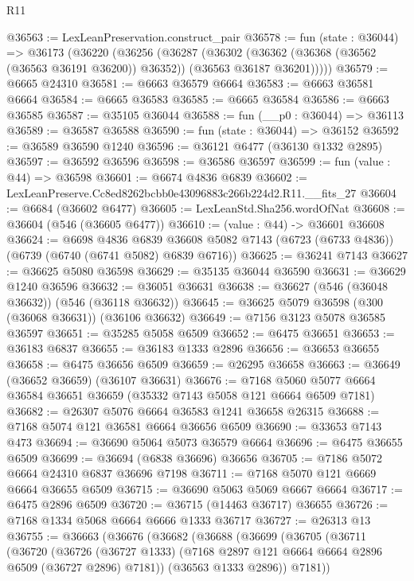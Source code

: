 \begin{lexlean}{R11}
\begin{coremodule}
@36563 := LexLeanPreservation.construct_pair
@36578 := fun (state : @36044) =>
  @36173
    (@36220
      (@36256
        (@36287
          (@36302
            (@36362 (@36368 (@36562 (@36563 @36191 @36200)) @36352))
            (@36563 @36187 @36201)))))
@36579 := @6665 @24310
@36581 := @6663 @36579 @6664
@36583 := @6663 @36581 @6664
@36584 := @6665 @36583
@36585 := @6665 @36584
@36586 := @6663 @36585
@36587 := @35105 @36044
@36588 := fun (__p0 : @36044) => @36113
@36589 := @36587 @36588
@36590 := fun (state : @36044) => @36152
@36592 := @36589 @36590 @1240
@36596 := @36121 @6477 (@36130 @1332 @2895)
@36597 := @36592 @36596
@36598 := @36586 @36597
@36599 := fun (value : @44) => @36598
@36601 := @6674 @4836 @6839
@36602 := LexLeanPreserve.Cc8ed8262bcbb0e43096883c266b224d2.R11.__fits_27
@36604 := @6684 (@36602 @6477)
@36605 := LexLeanStd.Sha256.wordOfNat
@36608 := @36604 (@546 (@36605 @6477))
@36610 := (value : @44) -> @36601 @36608
@36624 := @6698
    @4836
    @6839
    @36608
    @5082
    @7143
    (@6723 (@6733 @4836))
    (@6739 (@6740 (@6741 @5082) @6839 @6716))
@36625 := @36241 @7143
@36627 := @36625 @5080 @36598
@36629 := @35135 @36044 @36590
@36631 := @36629 @1240 @36596
@36632 := @36051 @36631
@36638 := @36627 (@546 (@36048 @36632)) (@546 (@36118 @36632))
@36645 := @36625 @5079 @36598 (@300 (@36068 @36631)) (@36106 @36632)
@36649 := @7156 @3123 @5078 @36585 @36597
@36651 := @35285 @5058 @6509
@36652 := @6475 @36651
@36653 := @36183 @6837
@36655 := @36183 @1333 @2896
@36656 := @36653 @36655
@36658 := @6475 @36656 @6509
@36659 := @26295 @36658
@36663 := @36649 (@36652 @36659) (@36107 @36631)
@36676 := @7168 @5060 @5077 @6664 @36584 @36651 @36659 (@35332 @7143 @5058 @121 @6664 @6509 @7181)
@36682 := @26307 @5076 @6664 @36583 @1241 @36658 @26315
@36688 := @7168 @5074 @121 @36581 @6664 @36656 @6509
@36690 := @33653 @7143 @473
@36694 := @36690 @5064 @5073 @36579 @6664
@36696 := @6475 @36655 @6509
@36699 := @36694 (@6838 @36696) @36656
@36705 := @7186 @5072 @6664 @24310 @6837 @36696 @7198
@36711 := @7168 @5070 @121 @6669 @6664 @36655 @6509
@36715 := @36690 @5063 @5069 @6667 @6664
@36717 := @6475 @2896 @6509
@36720 := @36715 (@14463 @36717) @36655
@36726 := @7168 @1334 @5068 @6664 @6666 @1333 @36717
@36727 := @26313 @13
@36755 := @36663
    (@36676
      (@36682
        (@36688
          (@36699
            (@36705
              (@36711
                (@36720
                  (@36726
                    (@36727 @1333)
                    (@7168 @2897 @121 @6664 @6664 @2896 @6509 (@36727 @2896) @7181))
                  (@36563 @1333 @2896))
                @7181))

\end{coremodule}
\end{lexlean}
